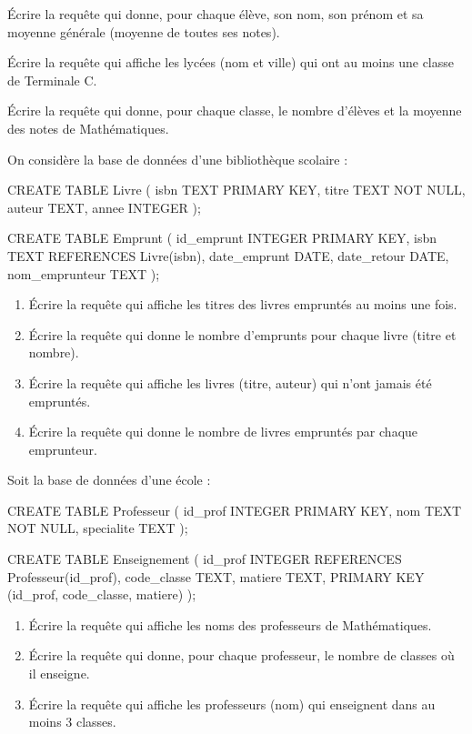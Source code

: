\exo{}
Écrire la requête qui donne, pour chaque élève, son nom, son prénom et sa moyenne générale (moyenne de toutes ses notes).

\exo{}
Écrire la requête qui affiche les lycées (nom et ville) qui ont au moins une classe de Terminale C.

\exo{}
Écrire la requête qui donne, pour chaque classe, le nombre d'élèves et la moyenne des notes de Mathématiques.


\sujetbac[2023, Cameroun]
\exo{}
On considère la base de données d'une bibliothèque scolaire :
\begin{sqlcode}
CREATE TABLE Livre (
    isbn TEXT PRIMARY KEY,
    titre TEXT NOT NULL,
    auteur TEXT,
    annee INTEGER
);

CREATE TABLE Emprunt (
    id_emprunt INTEGER PRIMARY KEY,
    isbn TEXT REFERENCES Livre(isbn),
    date_emprunt DATE,
    date_retour DATE,
    nom_emprunteur TEXT
);
\end{sqlcode}
\begin{enumerate}
    \item Écrire la requête qui affiche les titres des livres empruntés au moins une fois.
    \item Écrire la requête qui donne le nombre d'emprunts pour chaque livre (titre et nombre).
    \item Écrire la requête qui affiche les livres (titre, auteur) qui n'ont jamais été empruntés.
    \item Écrire la requête qui donne le nombre de livres empruntés par chaque emprunteur.
\end{enumerate}

\sujetbac[2022, Cameroun]
\exo{}
Soit la base de données d'une école :
\begin{sqlcode}
CREATE TABLE Professeur (
    id_prof INTEGER PRIMARY KEY,
    nom TEXT NOT NULL,
    specialite TEXT
);

CREATE TABLE Enseignement (
    id_prof INTEGER REFERENCES Professeur(id_prof),
    code_classe TEXT,
    matiere TEXT,
    PRIMARY KEY (id_prof, code_classe, matiere)
);
\end{sqlcode}
\begin{enumerate}
    \item Écrire la requête qui affiche les noms des professeurs de Mathématiques.
    \item Écrire la requête qui donne, pour chaque professeur, le nombre de classes où il enseigne.
    \item Écrire la requête qui affiche les professeurs (nom) qui enseignent dans au moins 3 classes.
\end{enumerate}

